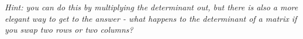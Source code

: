 \begin{questions}
\begin{parts}
					\emph{Hint: you can do this by multiplying the determinant out, but there is also a more elegant way to get to the answer - what happens to the determinant of a matrix if you swap two rows or two columns?}
				
			\end{parts}
	
\end{questions}
